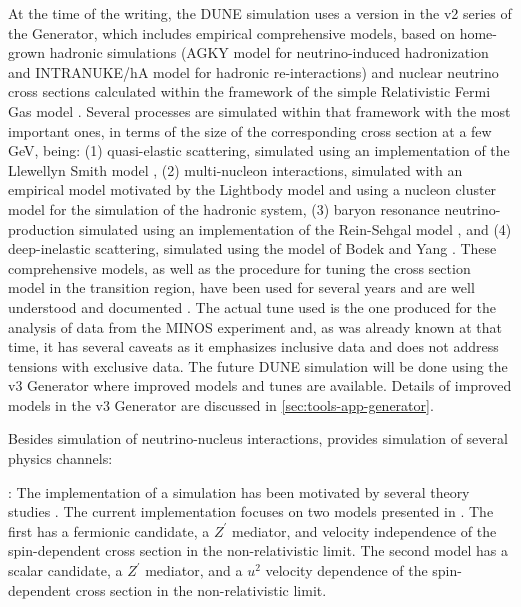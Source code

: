 At the time of the  writing, the DUNE simulation uses a version in the v2 series of the  Generator, which includes empirical comprehensive models, based on home-grown hadronic simulations (AGKY model \cite{Yang:2009zx} for neutrino-induced hadronization and INTRANUKE/hA model \cite{Dytman:2015taa} for hadronic re-interactions) and nuclear neutrino cross sections calculated within the framework of the simple Relativistic Fermi Gas model \cite{Bodek:1981wr}. Several processes are simulated within that framework with the most important ones, in terms of the size of the corresponding cross section at a few GeV, being: (1) quasi-elastic scattering, simulated using an implementation of the Llewellyn Smith model \cite{LlewellynSmith:1971uhs}, (2) multi-nucleon interactions, simulated with an empirical model motivated by the Lightbody model \cite{Lightbody:1988gcu} and using a nucleon cluster model for the simulation of the hadronic system, (3) baryon resonance neutrino-production simulated using an implementation of the Rein-Sehgal model \cite{Rein:1980wg}, and (4) deep-inelastic scattering, simulated using the model of Bodek and Yang \cite{Bodek:2002ps}.  These comprehensive models, as well as the  procedure for tuning the cross section model in the transition region, have been used for several years and are well understood and documented \cite{Andreopoulos:2009rq}. The actual tune used is the one produced for the analysis of data from the MINOS experiment and, as was already known at that time, it has several caveats as it emphasizes inclusive data and does not address tensions with exclusive data. The future DUNE simulation will be done using the v3  Generator where improved models and tunes are available. Details of improved models in the v3  Generator are discussed in \ref{sec:tools-app-generator}. %



Besides simulation of neutrino-nucleus interactions,  provides simulation of several  physics channels:

\textit{}: The implementation of a   simulation has been motivated by several theory studies \cite{Agashe:2014yua, 
Berger:2014sqa, Kong:2014mia, Cherry:2015oca, Kopp:2015bfa, Necib:2016aez, Alhazmi:2016qcs, Kim:2016zjx}. The current implementation focuses on two models presented in  \cite{Berger:2014sqa}. The first has a fermionic  candidate, a $Z^\prime$ mediator, and velocity independence of the spin-dependent cross section in the non-relativistic limit. The second model has a scalar  candidate, a $Z^\prime$ mediator, and a $u^2$ velocity dependence of the spin-dependent cross section in the non-relativistic limit.

